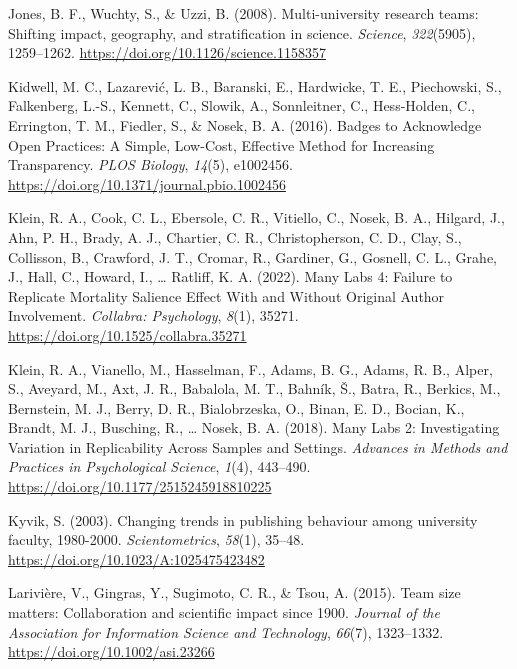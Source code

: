 \documentclass[
  man,mask,floatsintext]{apa7}
\newlength{\cslhangindent}
\newlength{\cslentryspacingunit} %
\newenvironment{CSLReferences}[2] %
 {%
  \setlength{\parindent}{0pt}
  \ifodd #1
  \let\oldpar\par
  \def\par{\hangindent=\cslhangindent\oldpar}
  \fi
  \setlength{\parskip}{#2\cslentryspacingunit}
 }%
 {}
\begin{document}
\begin{CSLReferences}{1}{0}
\leavevmode{}%
Jones, B. F., Wuchty, S., \& Uzzi, B. (2008). Multi-university research teams: Shifting impact, geography, and stratification in science. \emph{Science}, \emph{322}(5905), 1259--1262. \url{https://doi.org/10.1126/science.1158357}

\leavevmode{}%
Kidwell, M. C., Lazarević, L. B., Baranski, E., Hardwicke, T. E., Piechowski, S., Falkenberg, L.-S., Kennett, C., Slowik, A., Sonnleitner, C., Hess-Holden, C., Errington, T. M., Fiedler, S., \& Nosek, B. A. (2016). Badges to Acknowledge Open Practices: A Simple, Low-Cost, Effective Method for Increasing Transparency. \emph{PLOS Biology}, \emph{14}(5), e1002456. \url{https://doi.org/10.1371/journal.pbio.1002456}

\leavevmode{}%
Klein, R. A., Cook, C. L., Ebersole, C. R., Vitiello, C., Nosek, B. A., Hilgard, J., Ahn, P. H., Brady, A. J., Chartier, C. R., Christopherson, C. D., Clay, S., Collisson, B., Crawford, J. T., Cromar, R., Gardiner, G., Gosnell, C. L., Grahe, J., Hall, C., Howard, I., \ldots{} Ratliff, K. A. (2022). Many Labs 4: Failure to Replicate Mortality Salience Effect With and Without Original Author Involvement. \emph{Collabra: Psychology}, \emph{8}(1), 35271. \url{https://doi.org/10.1525/collabra.35271}

\leavevmode{}%
Klein, R. A., Vianello, M., Hasselman, F., Adams, B. G., Adams, R. B., Alper, S., Aveyard, M., Axt, J. R., Babalola, M. T., Bahník, Š., Batra, R., Berkics, M., Bernstein, M. J., Berry, D. R., Bialobrzeska, O., Binan, E. D., Bocian, K., Brandt, M. J., Busching, R., \ldots{} Nosek, B. A. (2018). Many Labs 2: Investigating Variation in Replicability Across Samples and Settings. \emph{Advances in Methods and Practices in Psychological Science}, \emph{1}(4), 443--490. \url{https://doi.org/10.1177/2515245918810225}

\leavevmode{}%
Kyvik, S. (2003). Changing trends in publishing behaviour among university faculty, 1980-2000. \emph{Scientometrics}, \emph{58}(1), 35--48. \url{https://doi.org/10.1023/A:1025475423482}

\leavevmode{}%
Larivière, V., Gingras, Y., Sugimoto, C. R., \& Tsou, A. (2015). Team size matters: Collaboration and scientific impact since 1900. \emph{Journal of the Association for Information Science and Technology}, \emph{66}(7), 1323--1332. \url{https://doi.org/10.1002/asi.23266}


\end{CSLReferences}
\end{document}
